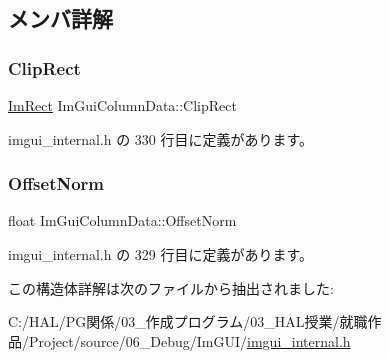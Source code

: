 \subsection{メンバ詳解}
\mbox{\label{struct_im_gui_column_data_aeccf8bbbd380fdd9d3350b5aac95ad34}} 
\subsubsection{\texorpdfstring{Clip\+Rect}{ClipRect}}
{\footnotesize\ttfamily \mbox{\hyperlink{struct_im_rect}{Im\+Rect}} Im\+Gui\+Column\+Data\+::\+Clip\+Rect}



 imgui\+\_\+internal.\+h の 330 行目に定義があります。

\mbox{\label{struct_im_gui_column_data_a9678a00f55c9fa44ed35ec14ea9b697b}} 
\subsubsection{\texorpdfstring{Offset\+Norm}{OffsetNorm}}
{\footnotesize\ttfamily float Im\+Gui\+Column\+Data\+::\+Offset\+Norm}



 imgui\+\_\+internal.\+h の 329 行目に定義があります。



この構造体詳解は次のファイルから抽出されました\+:\begin{DoxyCompactItemize}
\item 
C\+:/\+H\+A\+L/\+P\+G関係/03\+\_\+作成プログラム/03\+\_\+\+H\+A\+L授業/就職作品/\+Project/source/06\+\_\+\+Debug/\+Im\+G\+U\+I/\mbox{\hyperlink{imgui__internal_8h}{imgui\+\_\+internal.\+h}}\end{DoxyCompactItemize}
